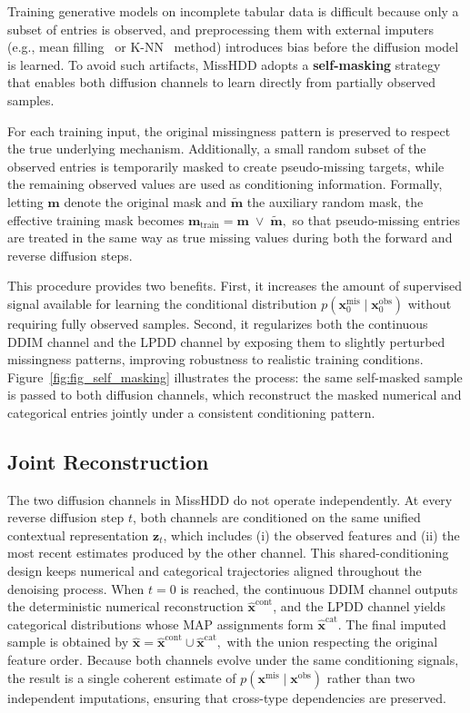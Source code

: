 \documentclass[times, review, 10pt]{elsarticle}
\begin{document}
Training generative models on incomplete tabular data is difficult because
only a subset of entries is observed, and preprocessing them with external
imputers (e.g., mean filling~\cite{mean} or K-NN~\cite{knn} method) introduces bias before the diffusion
model is learned. To avoid such artifacts, MissHDD adopts a \textbf{self-masking}
strategy that enables both diffusion channels to learn directly from partially
observed samples.

For each training input, the original missingness pattern is preserved to
respect the true underlying mechanism. Additionally, a small random subset of
the observed entries is temporarily masked to create pseudo-missing targets,
while the remaining observed values are used as conditioning information.
Formally, letting $\mathbf{m}$ denote the original mask and $\tilde{\mathbf{m}}$
the auxiliary random mask, the effective training mask becomes
$
\mathbf{m}_{\mathrm{train}} = \mathbf{m} \;\lor\; \tilde{\mathbf{m}},
$
so that pseudo-missing entries are treated in the same way as true missing
values during both the forward and reverse diffusion steps.

This procedure provides two benefits. First, it increases the amount of
supervised signal available for learning the conditional distribution
$p(\mathbf{x}_0^{\mathrm{mis}} \mid \mathbf{x}_0^{\mathrm{obs}})$ without
requiring fully observed samples. Second, it regularizes both the continuous
DDIM channel and the LPDD channel by exposing them to slightly perturbed
missingness patterns, improving robustness to realistic training conditions. Figure~\ref{fig:fig_self_masking} illustrates the process: the same
self-masked sample is passed to both diffusion channels, which reconstruct the
masked numerical and categorical entries jointly under a consistent
conditioning pattern.




\subsection{Joint Reconstruction}

The two diffusion channels in MissHDD do not operate independently. At every
reverse diffusion step $t$, both channels are conditioned on the same unified
contextual representation $\mathbf{z}_t$, which includes (i) the observed
features and (ii) the most recent estimates produced by the other channel.
This shared-conditioning design keeps numerical and categorical trajectories
aligned throughout the denoising process. When $t=0$ is reached, the continuous DDIM channel outputs the deterministic
numerical reconstruction $\hat{\mathbf{x}}^{\mathrm{cont}}$, and the LPDD
channel yields categorical distributions whose MAP assignments form
$\hat{\mathbf{x}}^{\mathrm{cat}}$. The final imputed sample is obtained by $ \hat{\mathbf{x}} = \hat{\mathbf{x}}^{\mathrm{cont}}\cup \hat{\mathbf{x}}^{\mathrm{cat}},$ with the union respecting the original feature order. Because both channels evolve under the same conditioning signals, the result is a single coherent estimate of $p(\mathbf{x}^{\mathrm{mis}} \mid \mathbf{x}^{\mathrm{obs}})$ rather than two
independent imputations, ensuring that cross-type dependencies are preserved.
\end{document}
